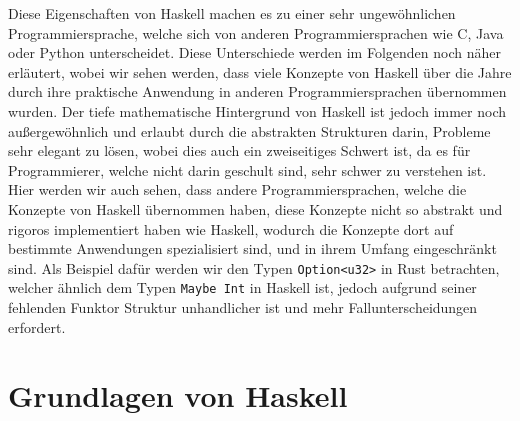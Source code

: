 \documentclass{hhuarticle}
\theoremstyle{definition}
\theoremstyle{theorem}
\begin{document}
  Diese Eigenschaften von Haskell machen es zu einer sehr ungewöhnlichen
  Programmiersprache, welche sich von anderen Programmiersprachen
  wie C, Java oder Python unterscheidet. Diese Unterschiede werden
  im Folgenden noch näher erläutert, wobei wir sehen werden,
  dass viele Konzepte von Haskell über die Jahre durch ihre praktische
  Anwendung in anderen Programmiersprachen übernommen wurden.
  Der tiefe mathematische Hintergrund von Haskell ist jedoch
  immer noch außergewöhnlich und erlaubt durch die abstrakten
  Strukturen darin, Probleme sehr elegant zu lösen, wobei dies auch
  ein zweiseitiges Schwert ist, da es für Programmierer, welche
  nicht darin geschult sind, sehr schwer zu verstehen ist. Hier werden
  wir auch sehen, dass andere Programmiersprachen, welche die
  Konzepte von Haskell übernommen haben, diese Konzepte nicht
  so abstrakt und rigoros implementiert haben wie Haskell, wodurch
  die Konzepte dort auf bestimmte Anwendungen spezialisiert sind,
  und in ihrem Umfang eingeschränkt sind.
  Als Beispiel dafür werden wir den Typen \verb|Option<u32>| in
  Rust betrachten, welcher ähnlich dem Typen \verb|Maybe Int| in Haskell
  ist, jedoch aufgrund seiner fehlenden Funktor Struktur unhandlicher
  ist und mehr Fallunterscheidungen erfordert.






  \section{Grundlagen von Haskell}
  
\end{document}
